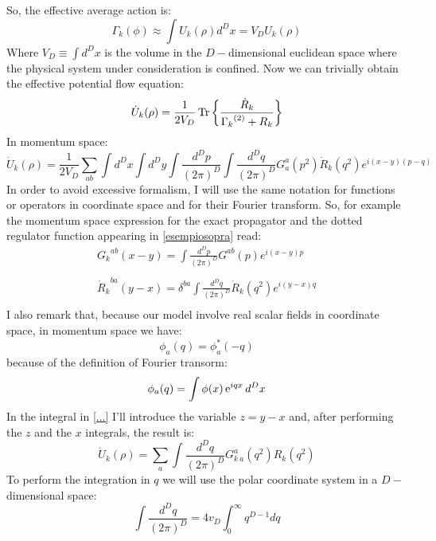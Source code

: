 So, the effective average action is:
\begin{equation}
\Gamma_k(\phi) \approx \int U_k{(\rho)} d^Dx = V_D U_k{(\rho)}
\end{equation}
Where $V_D\equiv\int d^D x$ is the volume in the  $D-$dimensional euclidean space where the physical system under consideration is confined. Now we can trivially obtain the effective potential flow equation:
\begin{equation}\label{esempiosopra}
 \dot{U}_k{(\rho)} = \frac{1}{2V_D} \operatorname{Tr}\left\{ \frac{\dot{R}_k}{{\Gamma_k}^{(2)} + R_k}\right\}
\end{equation}
In momentum space:
\begin{equation}\label{...}
\dot{U}_k(\rho) = \frac{1}{2V_D}\sum_{ab} \int d^Dx \int d^D y \int \frac{d^Dp}{(2\pi)^D} \int \frac{d^Dq}{(2\pi)^D} {G}^{a}_a(p^2)\dot{R}_k(q^2) e ^{i(x-y)(p-q)}
\end{equation}
In order to avoid excessive formalism, I will use the same notation for functions or operators in coordinate space and for their Fourier transform.
So, for example the momentum space expression for the exact propagator and the dotted regulator function appearing in \eqref{esempiosopra} read:
\begin{displaymath}
\left.
\begin{array}{l}
 {G_k}^{ab} (x-y) = \int \frac{d^Dp}{(2\pi)^D} {G}^{ab}(p) e^{i(x-y)p}  \\
  \\
 {\dot{R}_k}^{ba} (y-x) =  \delta^{ba} \int \frac{d^Dq}{(2\pi)^D} \dot{R}_k(q^2) e ^{i(y-x)q}\\

 \end{array} 
\right.
\end{displaymath}
I also remark that, because our model involve real scalar fields in coordinate space, in momentum space we have:
$$\phi_a(q) = \phi^*_a(-q)$$
because of the definition of Fourier transorm: 
$$ \phi_a(q) = \int \phi(x) \operatorname{e}^{iqx}d^Dx$$
In the integral in \eqref{...} I'll introduce the variable $ z = y - x $ and, after performing the $z$ and the $x$ integrals, the result is:
\begin{equation}\label{settte}
\dot{U}_k(\rho) = \sum_{a} \int \frac{d^Dq}{(2\pi)^D} {G}^{a}_{k\ a}(q^2)R_k(q^2)
\end{equation}
To perform the integration in $q$ we will use the polar coordinate system in a $D-$dimensional space:
\begin{equation}
 \int \frac{d^Dq}{(2\pi)^D} = 4v_D \int_0^\infty q^{D-1}dq
\end{equation}
